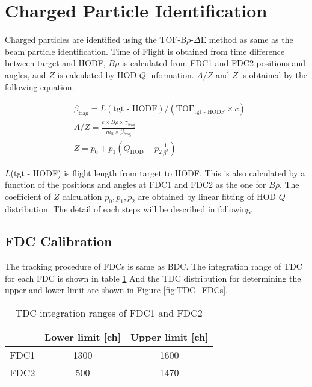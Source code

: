 \clearpage

\section{Charged Particle Identification}

Charged particles are identified using the TOF-B$\rho$-$\Delta$E method as same as the beam particle identification. Time of Flight is obtained from time difference between target and HODF, $B\rho$ is calculated from FDC1 and FDC2 positions and angles, and $Z$ is calculated by HOD $Q$ information. $A/Z$ and $Z$ is obtained by the following equation.

\begin{align}
    &\beta_{\text{frag}} = L(\text{tgt - HODF}) / ( {\text{TOF}}_{\text{tgt - HODF}} \times c )\\
    &A/Z = \frac{c \times B\rho \times \gamma_{\text{frag}}} { m_u \times \beta_{\text{frag}}}\\
    &Z = p_0 + p_1 (Q_{\text{HOD}} - p_2 \frac{1}{\beta^2})
\end{align}

$L$(tgt - HODF) is flight length from target to HODF. This is also calculated by a function of the positions and angles at FDC1 and FDC2 as the one for $B\rho$. The coefficient of $Z$ calculation $p_0, p_1, p_2$ are obtained by linear fitting of HOD $Q$ distribution. The detail of each steps will be described in following.

\subsection{FDC Calibration}
The tracking procedure of FDCs is same as BDC. The integration range of TDC for each FDC is shown in table \ref{tab:TDC_FDCs} And the TDC distribution for determining the upper and lower limit are shown in Figure \ref{fig:TDC_FDCs}. 
\begin{table}[h]
    \centering
    \begin{tabular}{c|cc}
        \hline
        &Lower limit [ch]&Upper limit [ch]\\
        \hline
        FDC1&1300&1600\\
        FDC2&500&1470\\        
        \hline
    \end{tabular}
    \caption[TDC integration range of FDCs]{TDC integration ranges of FDC1 and FDC2}
    \label{tab:TDC_FDCs}
\end{table}

